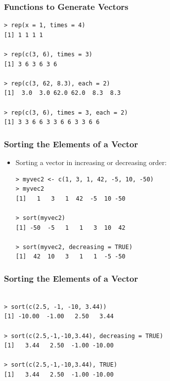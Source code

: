 \documentclass[xcolor=dvipsnames, xcolor=table]{beamer} %
\theoremstyle{mystyle}
\begin{document}
\begin{frame}[fragile] %
\frametitle{Functions to Generate Vectors}

\begin{verbatim}
> rep(x = 1, times = 4)
[1] 1 1 1 1

> rep(c(3, 6), times = 3)
[1] 3 6 3 6 3 6

> rep(c(3, 62, 8.3), each = 2)
[1]  3.0  3.0 62.0 62.0  8.3  8.3

> rep(c(3, 6), times = 3, each = 2)
[1] 3 3 6 6 3 3 6 6 3 3 6 6
\end{verbatim}



\end{frame}


\begin{frame}[fragile] %
\frametitle{Sorting the Elements of a Vector}
\begin{itemize}
\item Sorting a vector in increasing or decreasing order: 
\begin{verbatim}
> myvec2 <- c(1, 3, 1, 42, -5, 10, -50)
> myvec2
[1]   1   3   1  42  -5  10 -50

> sort(myvec2)
[1] -50  -5   1   1   3  10  42

> sort(myvec2, decreasing = TRUE)
[1]  42  10   3   1   1  -5 -50

\end{verbatim}

\end{itemize}



\end{frame}

\begin{frame}[fragile] %
\frametitle{Sorting the Elements of a Vector}
\begin{verbatim}

> sort(c(2.5, -1, -10, 3.44))
[1] -10.00  -1.00   2.50   3.44

> sort(c(2.5,-1,-10,3.44), decreasing = TRUE)
[1]   3.44   2.50  -1.00 -10.00

> sort(c(2.5,-1,-10,3.44), TRUE)
[1]   3.44   2.50  -1.00 -10.00
\end{verbatim}

\end{frame}
\end{document}
